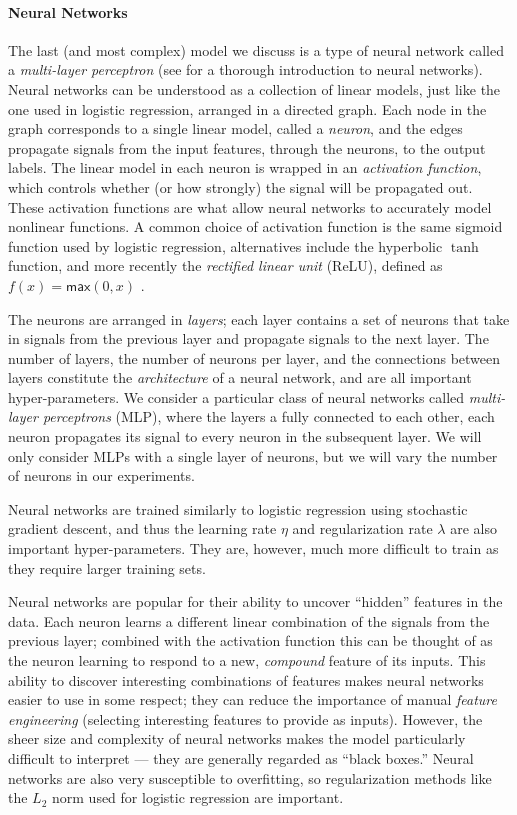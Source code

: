 \paragraph{Neural Networks}
The last (and most complex) model we discuss is a type of neural network
called a \emph{multi-layer perceptron} (see \citealt{Nielsen2015-pu} for
a thorough introduction to neural networks).
%
Neural networks can be understood as a collection of linear models, just
like the one used in logistic regression, arranged in a directed graph.
%
Each node in the graph corresponds to a single linear model, called a
\emph{neuron}, and the edges propagate signals from the input features,
through the neurons, to the output labels.
%
The linear model in each neuron is wrapped in an \emph{activation
  function}, which controls whether (or how strongly) the signal will be
propagated out.
%
These activation functions are what allow neural networks to accurately
model nonlinear functions.
%
A common choice of activation function is the same sigmoid function used
by logistic regression, alternatives include the hyperbolic $\tanh$
function, and more recently the \emph{rectified linear unit} (ReLU),
defined as $f(x) = \mathsf{max}(0,x)$ \citep{Nair2010-xg}.

The neurons are arranged in \emph{layers}; each layer contains a set of
neurons that take in signals from the previous layer and propagate
signals to the next layer.
%
The number of layers, the number of neurons per layer, and the
connections between layers constitute the \emph{architecture} of a
neural network, and are all important hyper-parameters.
%
We consider a particular class of neural networks called
\emph{multi-layer perceptrons} (MLP), where the layers a fully connected to
each other, \ie each neuron propagates its signal to every neuron in the
subsequent layer.
%
We will only consider MLPs with a single layer of neurons, but we will
vary the number of neurons in our experiments.

Neural networks are trained similarly to logistic regression using
stochastic gradient descent, and thus the learning rate $\eta$ and
regularization rate $\lambda$ are also important hyper-parameters.
%
They are, however, much more difficult to train as they require larger
training sets.

Neural networks are popular for their ability to uncover ``hidden''
features in the data.
%
Each neuron learns a different linear combination of the signals from
the previous layer; combined with the activation function this can be
thought of as the neuron learning to respond to a new, \emph{compound}
feature of its inputs.
%
This ability to discover interesting combinations of features makes
neural networks easier to use in some respect; they can reduce the
importance of manual \emph{feature engineering} (selecting interesting
features to provide as inputs).
%
However, the sheer size and complexity of neural networks makes the
model particularly difficult to interpret --- they are generally regarded
as ``black boxes.''
%
Neural networks are also very susceptible to overfitting, so
regularization methods like the $L_2$ norm used for logistic regression
are important.

